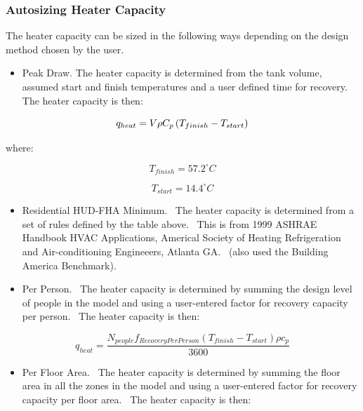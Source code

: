 \subsubsection{Autosizing Heater Capacity}\label{autosizing-heater-capacity}

The heater capacity can be sized in the following ways depending on the design method chosen by the user.

\begin{itemize}
  \item Peak Draw. The heater capacity is determined from the tank volume, assumed start and finish temperatures and a user defined time for recovery.~ The heater capacity is then:
\end{itemize}

\begin{equation}
  q_{heat} = V\rho C_p \left(T_{finish} - T_{start}\right)
\end{equation}

where:

\begin{equation}
{T_{finish}} = 57.2^{\circ}C
\end{equation}

\begin{equation}
{T_{start}} = 14.4^{\circ}C
\end{equation}

\begin{itemize}
\item Residential HUD-FHA Minimum.~ The heater capacity is determined from a set of rules defined by the table above.~ This is from 1999 ASHRAE Handbook HVAC Applications, Americal Society of Heating Refrigeration and Air-conditioning Engineeers, Atlanta GA.~ (also used the Building America Benchmark).
\item Per Person.~ The heater capacity is determined by summing the design level of people in the model and using a user-entered factor for recovery capacity per person.~ The heater capacity is then:
\end{itemize}

\begin{equation}
{q_{heat}} = \frac{{{N_{people}}{f_{RecoveryPerPerson}}({T_{finish}} - {T_{start}}) \rho {c_p}}}{{3600}}
\end{equation}

\begin{itemize}
\item Per Floor Area.~ The heater capacity is determined by summing the floor area in all the zones in the model and using a user-entered factor for recovery capacity per floor area.~ The heater capacity is then:
\end{itemize}

